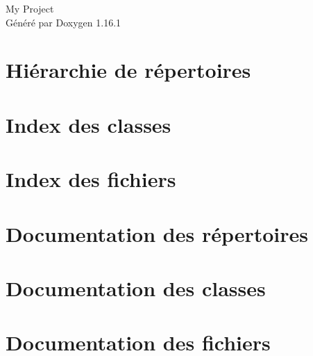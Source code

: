 \documentclass[twoside]{book}
\newcommand{\+}{\discretionary{\mbox{\scriptsize$\hookleftarrow$}}{}{}}
\newcommand{\clearemptydoublepage}{%
    \newpage{\pagestyle{empty}\cleardoublepage}%
  }
\begin{document}
  \raggedbottom
    \hypersetup{pageanchor=false,
                bookmarksnumbered=true,
                pdfencoding=unicode
               }
  \begin{titlepage}
  \vspace*{7cm}
  \begin{center}%
  {\Large My Project}\\
  \vspace*{1cm}
  {\large Généré par Doxygen 1.16.1}\\
  \end{center}
  \end{titlepage}
  \clearemptydoublepage
  \tableofcontents
  \clearemptydoublepage
  \hypersetup{pageanchor=true}

\chapter{Hiérarchie de répertoires}

\chapter{Index des classes}

\chapter{Index des fichiers}

\chapter{Documentation des répertoires}






\chapter{Documentation des classes}








\chapter{Documentation des fichiers}




















  \backmatter
  \newpage
  \clearemptydoublepage
  \printindex
\end{document}

